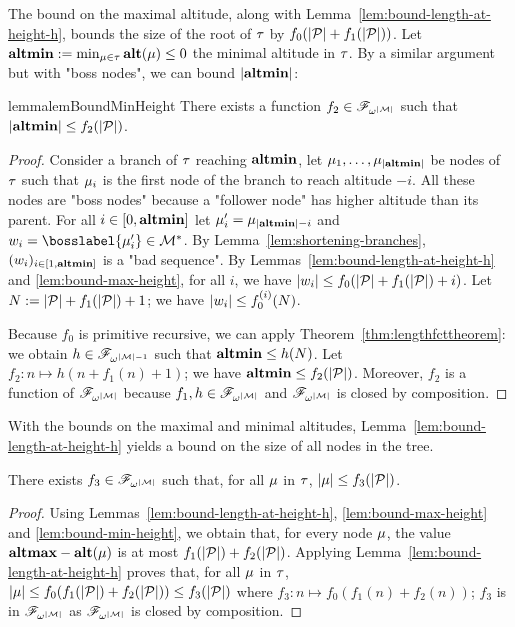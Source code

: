 The bound on the maximal altitude, along with Lemma~\ref{lem:bound-length-at-height-h}, bounds the size of the root of $\tau$ by $f_0(|\mathcal{P}| + f_1(|\mathcal{P}|))$. Let $\mathbf{altmin} := \min_{\mu \in \tau} \mathbf{alt}(\mu) \leq 0$ the minimal altitude in $\tau$. By a similar argument but with "boss nodes", we can bound $|\mathbf{altmin}|$:


\begin{restatable}{lemma}{lemBoundMinHeight}
	\label{lem:bound-min-height}
	There exists a function $f_2 \in \mathscr{F}_{\omega^{|\mathcal{M}|}}$ such that $|\mathbf{altmin}| \leq f_2(|\mathcal{P}|)$.
\end{restatable}

\begin{proof}
	Consider a branch of $\tau$ reaching $\mathbf{altmin}$, let $\mu_1, \ldots, \mu_{|\mathbf{altmin}|}$ be nodes of $\tau$ such that $\mu_i$ is the first node of the branch to reach altitude $-i$. All these nodes are "boss nodes" because a "follower node" has higher altitude than its parent. 
	For all $i \in [0,\mathbf{altmin}]$ let $\mu'_i = \mu_{|\mathbf{altmin}|-i}$ and $w_i = \bosslabel{\node'_{i}} \in \messages^*$.
	By Lemma~\ref{lem:shortening-branches}, $(w_i)_{i \in [1,\mathbf{altmin}]}$ is a "bad sequence".
	By Lemmas~\ref{lem:bound-length-at-height-h} and \ref{lem:bound-max-height}, for all $i$, we have $|w_i| \leq f_0(|\mathcal{P}|+f_1(|\mathcal{P}|) +i)$. Let $N := |\mathcal{P}|+f_1(|\mathcal{P}|)+1$; we have $|w_i| \leq f_0^{(i)}(N)$.  
	
	Because $f_0$ is primitive recursive, we can apply Theorem~\ref{thm:lengthfcttheorem}: we obtain $h \in \mathscr{F}_{\omega^{|\mathcal{M}|-1}}$ such that $\mathbf{altmin} \leq h(N)$. Let $f_2: n \mapsto h(n+ f_1(n) + 1)$; we have $\mathbf{altmin} \leq f_2(|\mathcal{P}|)$. Moreover, $f_2$ is a function of $\mathscr{F}_{\omega^{|\mathcal{M}|}}$ because $f_1, h \in \mathscr{F}_{\omega^{|\mathcal{M}|}}$ and $\mathscr{F}_{\omega^{|\mathcal{M}|}}$ is closed by composition.
\end{proof}

With the bounds on the maximal and minimal altitudes, Lemma~\ref{lem:bound-length-at-height-h} yields a bound on the size of all nodes in the tree.


\begin{lemma}
	\label{lem:bound-node-size}
	There exists $f_3 \in \mathscr{F}_{\omega^{|\mathcal{M}|}}$ such that, for all $\mu$ in $\tau$, $|\mu| \leq f_3(|\mathcal{P}|)$. 
\end{lemma}
\begin{proof}
	Using Lemmas~\ref{lem:bound-length-at-height-h}, \ref{lem:bound-max-height} and \ref{lem:bound-min-height}, we obtain that, for every node $\mu$, the value $\mathbf{altmax} - \mathbf{alt}(\mu)$ is at most $f_1(|\mathcal{P}|) + f_2(|\mathcal{P}|)$. Applying Lemma~\ref{lem:bound-length-at-height-h} proves that, for all $\mu$ in $\tau$, $|\mu| \leq f_0(f_1(|\mathcal{P}|) + f_2(|\mathcal{P}|)) \leq f_3(|\mathcal{P}|)$ where $f_3: n \mapsto f_0(f_1(n) + f_2(n))$; $f_3$ is in $\mathscr{F}_{\omega^{|\mathcal{M}|}}$ as $\mathscr{F}_{\omega^{|\mathcal{M}|}}$ is closed by composition. 
\end{proof}

